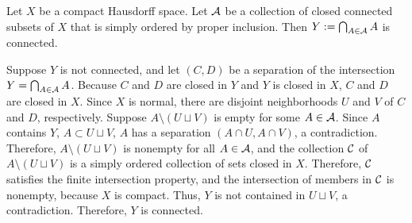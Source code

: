 \begin{prob}
    Let $X$ be a compact Hausdorff space.
    Let ${\mathcal{A}}$ be a collection of closed connected subsets of $X$ that is simply ordered by proper inclusion.
    Then $Y:=\bigcap_{A\in{\mathcal{A}}} A$ is connected.
\end{prob}
\begin{sol}
    Suppose $Y$ is not connected, and let $(C, D)$ be a separation of the intersection $Y=\bigcap_{A\in{\mathcal{A}}}A$.
    Because $C$ and $D$ are closed in $Y$ and $Y$ is closed in $X$, $C$ and $D$ are closed in $X$.
    Since $X$ is normal, there are disjoint neighborhoods $U$ and $V$ of $C$ and $D$, respectively.
    Suppose $A\setminus (U\sqcup V)$ is empty for some $A\in{\mathcal{A}}$.
    Since $A$ contains $Y$, $A\subset U\sqcup V$, $A$ has a separation $(A\cap U, A\cap V)$, a contradiction.
    Therefore, $A\setminus(U\sqcup V)$ is nonempty for all $A\in{\mathcal{A}}$, and the collection ${\mathcal{C}}$ of $A\setminus(U\sqcup V)$ is a simply ordered collection of sets closed in $X$.
    Therefore, ${\mathcal{C}}$ satisfies the finite intersection property, and the intersection of members in ${\mathcal{C}}$ is nonempty, because $X$ is compact.
    Thus, $Y$ is not contained in $U\sqcup V$, a contradiction.
    Therefore, $Y$ is connected.
\end{sol}